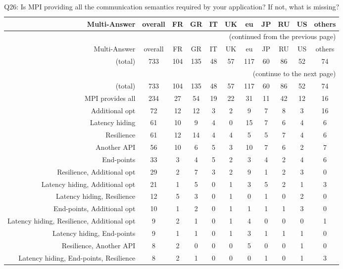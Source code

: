 \clearpage%
{\footnotesize\begin{landscape}%
\begin{longtable}[htb]{r|c|c|c|c|c|c|c|c|c|c}%
\caption{Q26: Is MPI providing all the communication semantics required by your application? If not, what is missing?}%
\label{tab:Q26-mans} \\%
\hline%
Multi-Answer & overall & FR & GR & IT & UK & eu & JP & RU & US & others \\
 \hline%
\endfirsthead%
\multicolumn{11}{r}{(continued from the previous page)}\\%
\hline%
Multi-Answer & overall & FR & GR & IT & UK & eu & JP & RU & US & others \\
 \hline%
\endhead%
\hline%
(total) & 733 & 104 & 135 & 48 & 57 & 117 & 60 & 86 & 52 & 74 \\%
\hline%
\multicolumn{11}{r}{(continue to the next page)}\\%
\endfoot%
\hline%
(total) & 733 & 104 & 135 & 48 & 57 & 117 & 60 & 86 & 52 & 74 \\%
\hline%
\endlastfoot%
\hline%
{MPI provides all} & 234 & 27 & 54 & 19 & 22 & 31 & 11 & 42 & 12 & 16 \\%
{Additional opt} & 72 & 12 & 12 & 3 & 2 & 9 & 7 & 8 & 3 & 16 \\%
{Latency hiding} & 61 & 10 & 9 & 4 & 0 & 15 & 7 & 6 & 4 & 6 \\%
{Resilience} & 61 & 12 & 14 & 4 & 4 & 5 & 5 & 7 & 4 & 6 \\%
{Another API} & 56 & 10 & 6 & 5 & 3 & 10 & 7 & 6 & 2 & 7 \\%
{End-points} & 33 & 3 & 4 & 5 & 2 & 3 & 4 & 2 & 4 & 6 \\%
{Resilience, Additional opt} & 29 & 2 & 7 & 3 & 2 & 9 & 1 & 2 & 3 & 0 \\%
{Latency hiding, Additional opt} & 21 & 1 & 5 & 0 & 1 & 3 & 5 & 2 & 1 & 3 \\%
{Latency hiding, Resilience} & 12 & 5 & 3 & 0 & 1 & 0 & 1 & 0 & 2 & 0 \\%
{End-points, Additional opt} & 10 & 1 & 2 & 0 & 1 & 1 & 1 & 1 & 3 & 0 \\%
{Latency hiding, Resilience, Additional opt} & 9 & 2 & 1 & 0 & 1 & 4 & 0 & 0 & 0 & 1 \\%
{Latency hiding, End-points} & 9 & 1 & 1 & 0 & 1 & 3 & 1 & 1 & 1 & 0 \\%
{Resilience, Another API} & 8 & 2 & 0 & 0 & 0 & 5 & 0 & 0 & 1 & 0 \\%
{Latency hiding, End-points, Resilience} & 8 & 2 & 1 & 0 & 0 & 0 & 1 & 0 & 1 & 3 \\%

\end{longtable}
\end{landscape}}
